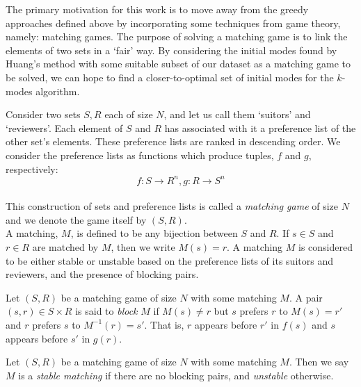 The primary motivation for this work is to move away from the greedy approaches
defined above by incorporating some techniques from game theory, namely:
matching games. The purpose of solving a matching game is to link the elements
of two sets in a `fair' way. By considering the initial modes found by Huang's 
method with some suitable subset of our dataset as a matching game to be solved, 
we can hope to find a closer-to-optimal set of initial modes for the \(k\)-modes 
algorithm.


\begin{definition}\label{def:matching-game}
    Consider two sets \(S, R\) each of size \(N\), and let us call them 
    `suitors' and `reviewers'. Each element of \(S\) and \(R\) has associated 
    with it a preference list of the other set's elements. These preference 
    lists are ranked in descending order. We consider the preference lists as 
    functions which produce tuples, \(f\) and \(g\), respectively:
	\[
	    f : S \to R^n, g : R \to S^n
	\]\\

	This construction of sets and preference lists is called a 
    \emph{matching game} of size \(N\) and we denote the game itself by 
    \((S,R)\).\\
	
    A matching, \(M\), is defined to be any bijection between \(S\) and \(R\). 
    If \(s \in S\) and \(r \in R\) are matched by \(M\), then we write \(M(s) = 
    r\). A matching \(M\) is considered to be either stable or unstable based on
    the preference lists of its suitors and reviewers, and the presence of 
    blocking pairs.
\end{definition}

\begin{definition}\label{def:blocking-pair}
    Let \((S, R)\) be a matching game of size \(N\) with some matching \(M\). A 
    pair \((s, r) \in S \times R\) is said to \emph{block} \(M\) if \(M(s) \ne
    r\) but \(s\) prefers \(r\) to \(M(s) = r'\) and \(r\) prefers \(s\) to
    \(M^{-1}(r) = s'\). That is, \(r\) appears before \(r'\) in \(f(s)\) and
    \(s\) appears before \(s'\) in \(g(r)\).
\end{definition}

\begin{definition}\label{def:stable-matching}
    Let \((S, R)\) be a matching game of size \(N\) with some matching \(M\). 
    Then we say \(M\) is a \emph{stable matching} if there are no blocking 
    pairs, and \emph{unstable} otherwise.
\end{definition}

